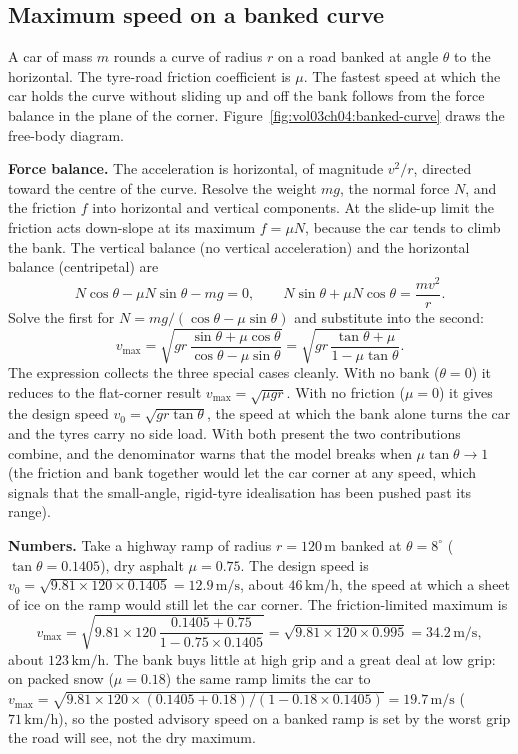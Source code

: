 \subsection{Maximum speed on a banked curve}

A car of mass $m$ rounds a curve of radius $r$ on a road banked at
angle $\theta$ to the horizontal. The tyre-road friction coefficient
is $\mu$. The fastest speed at which the car holds the curve without
sliding up and off the bank follows from the force balance in the
plane of the corner. Figure~\ref{fig:vol03ch04:banked-curve} draws the
free-body diagram.

\textbf{Force balance.} The acceleration is horizontal, of magnitude
$v^{2}/r$, directed toward the centre of the curve. Resolve the
weight $mg$, the normal force $N$, and the friction $f$ into horizontal
and vertical components. At the slide-up limit the friction acts
down-slope at its maximum $f=\mu N$, because the car tends to climb the
bank. The vertical balance (no vertical acceleration) and the
horizontal balance (centripetal) are
\[
N\cos\theta - \mu N\sin\theta - mg = 0, \qquad
N\sin\theta + \mu N\cos\theta = \frac{m v^{2}}{r}.
\]
Solve the first for $N=mg/(\cos\theta-\mu\sin\theta)$ and substitute
into the second:
\[
v_{\max}=\sqrt{g r\,\frac{\sin\theta+\mu\cos\theta}{\cos\theta-\mu
\sin\theta}}=\sqrt{g r\,\frac{\tan\theta+\mu}{1-\mu\tan\theta}}.
\]
The expression collects the three special cases cleanly. With no bank
($\theta=0$) it reduces to the flat-corner result $v_{\max}=\sqrt{\mu
g r}$. With no friction ($\mu=0$) it gives the design speed
$v_{0}=\sqrt{g r\tan\theta}$, the speed at which the bank alone turns
the car and the tyres carry no side load. With both present the two
contributions combine, and the denominator warns that the model breaks
when $\mu\tan\theta\to 1$ (the friction and bank together would let the
car corner at any speed, which signals that the small-angle, rigid-tyre
idealisation has been pushed past its range).

\textbf{Numbers.} Take a highway ramp of radius $r=120\,\si{\meter}$
banked at $\theta=8^{\circ}$ ($\tan\theta=0.1405$), dry asphalt
$\mu=0.75$. The design speed is $v_{0}=\sqrt{9.81\times 120\times
0.1405}=12.9\,\si{\meter\per\second}$, about $46\,\si{\kilo\meter\per
\hour}$, the speed at which a sheet of ice on the ramp would still let
the car corner. The friction-limited maximum is
\[
v_{\max}=\sqrt{9.81\times 120\,\frac{0.1405+0.75}{1-0.75\times 0.1405}}
=\sqrt{9.81\times 120\times 0.995}=34.2\,\si{\meter\per\second},
\]
about $123\,\si{\kilo\meter\per\hour}$. The bank buys little at high
grip and a great deal at low grip: on packed snow ($\mu=0.18$) the
same ramp limits the car to $v_{\max}=\sqrt{9.81\times 120\times
(0.1405+0.18)/(1-0.18\times 0.1405)}=19.7\,\si{\meter\per\second}$
($71\,\si{\kilo\meter\per\hour}$), so the posted advisory speed on a
banked ramp is set by the worst grip the road will see, not the dry
maximum.

